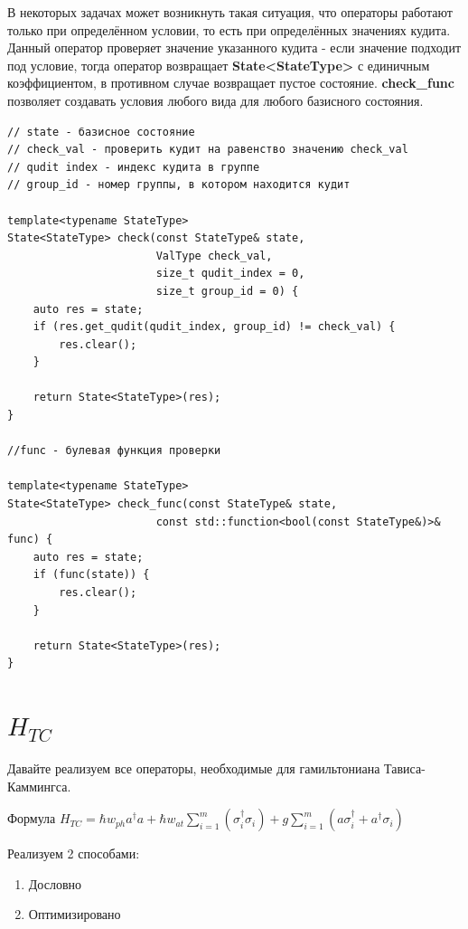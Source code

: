 \documentclass[12pt,fleqn]{article}
\begin{document}
        В некоторых задачах может возникнуть такая ситуация, что операторы работают только при определённом условии, то есть при определённых значениях кудита.
        Данный оператор проверяет значение указанного кудита - если значение подходит под условие, тогда оператор возвращает \textbf{State<StateType>} с единичным коэффициентом, 
        в противном случае возвращает пустое состояние. \textbf{check\_func} позволяет создавать условия любого вида для любого базисного состояния.

\begin{mdframed}[linecolor=black, topline=true, bottomline=true,
leftline=false, rightline=false]
\begin{verbatim}
// state - базисное состояние
// check_val - проверить кудит на равенство значению check_val
// qudit index - индекс кудита в группе
// group_id - номер группы, в котором находится кудит

template<typename StateType>
State<StateType> check(const StateType& state,
                       ValType check_val,
                       size_t qudit_index = 0,
                       size_t group_id = 0) {
    auto res = state;
    if (res.get_qudit(qudit_index, group_id) != check_val) {
        res.clear();
    }

    return State<StateType>(res);
}

//func - булевая функция проверки

template<typename StateType>
State<StateType> check_func(const StateType& state,
                       const std::function<bool(const StateType&)>& func) {
    auto res = state;
    if (func(state)) {
        res.clear();
    }

    return State<StateType>(res);
}
\end{verbatim}
\end{mdframed}

        \section{$H_{TC}$}

        Давайте реализуем все операторы, необходимые для гамильтониана Тависа-Каммингса.

        Формула $H_{TC} = \hbar{w_{ph}}{a^{\dagger}}{a} + {\hbar}{w_{at}}{\sum\limits_{i = 1}^{m}(\sigma^{\dagger}_{i}\sigma_{i})}
		+ {g}\sum\limits_{i=1}^{m}({a}\sigma^{\dagger}_{i} + a^{\dagger}\sigma_{i})$

        Реализуем 2 способами:
        \begin{enumerate}
            \item{Дословно}
            \item{Оптимизировано}
        \end{enumerate}
\end{document}
